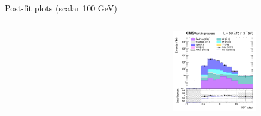 \documentclass[8pt]{beamer}
\begin{document}
\begin{frame}{Post-fit plots (scalar 100 GeV)}
\begin{columns}
\begin{column}{0.33\textwidth}
\begin{center}
    		\end{center}		
		\end{column}
		\begin{column}{0.33\textwidth}
			\begin{center}
     			\includegraphics[width=1.0\textwidth, height=100pt]{figs/postfits/2018/log_cratio_TTbar_topCR_ll_BDT_ttDM100_TTbar_BDT_output_scalar100_customBinsAttempt7.png}
    		\end{center}		
		\end{column}
\end{columns} \vfill
\end{frame}
\end{document}
